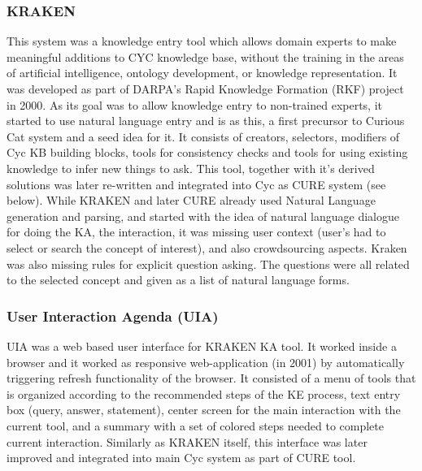 \subsubsection{KRAKEN}
\label{section:r:kraken}
This system was a knowledge entry tool which allows domain experts to
make meaningful additions to CYC knowledge base, without the training in the 
areas of artificial intelligence, ontology development, or knowledge
representation\parencite{Panton2002a}. It was developed as part of DARPA's
Rapid Knowledge Formation (RKF) project in 2000. As its goal was to allow
knowledge entry to non-trained experts, it started to use natural language 
entry and is as this, a first precursor to Curious Cat system and a seed idea
for it. It consists of creators, selectors, modifiers of Cyc KB building blocks,
tools for consistency checks and tools for using existing knowledge to infer new
things to ask. This tool, together with it's derived solutions was later 
re-written and integrated into Cyc as CURE system (see below). While KRAKEN and
later CURE already used Natural Language generation and parsing, and started 
with the idea of natural language dialogue for doing the KA, the interaction, it
was missing user context (user's had to select or search the concept of 
interest), and also crowdsourcing aspects. Kraken was also missing rules for
explicit question asking. The questions were all related to the selected concept
and given as a list of natural language forms.


\subsubsection{User Interaction Agenda (UIA)} 
\label{section:r:uia}
UIA was a web  based user interface for KRAKEN
KA tool\parencite{Panton2002a,Witbrock2003UIA}. It worked inside a browser and 
it worked as responsive web-application (in 2001) by automatically triggering refresh 
functionality of the browser. It consisted of a menu of tools that is organized
according to the recommended steps of the KE process, text entry box (query, 
answer, statement), center screen for the main interaction with the current 
tool, and a summary with a set of colored steps needed to complete current 
interaction. Similarly as KRAKEN itself, this interface was later improved
and integrated into main Cyc system as part of CURE tool. 

